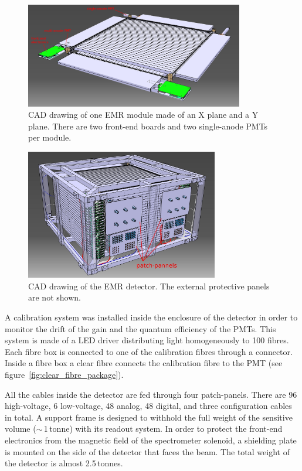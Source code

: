 \documentclass[a4paper,11pt]{article}
\begin{document}
\begin{figure}[htb]
 \centering
 \includegraphics[width=0.85\textwidth]{./emr_module}
 \caption[CAD drawing of one EMR module]{CAD drawing of one EMR module made of an X plane and a Y plane. There are two front-end boards
 and two single-anode PMTs per module.}
 \label{fig:emr_module}
\end{figure}

\begin{figure}[htp!]
 \centering
 \includegraphics[width=0.75\textwidth]{./emr_cad_model_1}
 \caption[CAD drawing of the EMR detector]{CAD drawing of the EMR detector. The external protective panels are not shown.}
 \label{fig:emr_full_cad_model}
\end{figure}

A calibration system was installed inside the enclosure of the detector in order to monitor the drift of the gain and the quantum
efficiency of the PMTs. This system is made of a LED driver distributing light homogeneously to 100 fibres. Each fibre box is
connected to one of the calibration fibres through a connector. Inside a fibre box a clear fibre connects the calibration
fibre to the PMT (see figure~\ref{fig:clear_fibre_package}).

All the cables inside the detector are fed through four patch-panels. There are 96 high-voltage, 6 low-voltage, 48 analog, 48 digital,
and three configuration cables in total. A support frame is designed to withhold the full weight of the sensitive volume ($\sim$\,1\,tonne) with
its readout system. In order to protect the front-end electronics from the magnetic field of the spectrometer solenoid,  a shielding plate is mounted
on the side of the detector that faces the beam. The total weight of the detector is almost 2.5\,tonnes.
\end{document}
